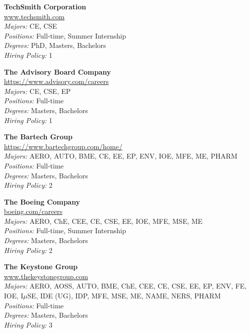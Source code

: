 \documentclass[twoside]{article}
\begin{document}
\begin{center}
\begin{multicols}{3}
\begin{minipage}{.9\columnwidth}{\Large\bf TechSmith Corporation }\\
	\url{www.techsmith.com}\\
	\emph{Majors:} CE, CSE\\
	\emph{Positions:} Full-time, Summer Internship\\
	\emph{Degrees:} PhD, Masters, Bachelors\\
	\emph{Hiring Policy:} 1\\
\end{minipage}
 
\begin{minipage}{.9\columnwidth}{\Large\bf The Advisory Board Company }\\
	\url{https://www.advisory.com/careers}\\
	\emph{Majors:} CE, CSE, EP\\
	\emph{Positions:} Full-time\\
	\emph{Degrees:} Masters, Bachelors\\
	\emph{Hiring Policy:} 1\\
\end{minipage}
 
\begin{minipage}{.9\columnwidth}{\Large\bf The Bartech Group }\\
	\url{https://www.bartechgroup.com/home/}\\
	\emph{Majors:} AERO, AUTO, BME, CE, EE, EP, ENV, IOE, MFE, ME, PHARM\\
	\emph{Positions:} Full-time\\
	\emph{Degrees:} Masters, Bachelors\\
	\emph{Hiring Policy:} 2\\
\end{minipage}
 
\begin{minipage}{.9\columnwidth}{\Large\bf The Boeing Company }\\
	\url{boeing.com/careers}\\
	\emph{Majors:} AERO, ChE, CEE, CE, CSE, EE, IOE, MFE, MSE, ME\\
	\emph{Positions:} Full-time, Summer Internship\\
	\emph{Degrees:} Masters, Bachelors\\
	\emph{Hiring Policy:} 2\\
\end{minipage}
 
\begin{minipage}{.9\columnwidth}{\Large\bf The Keystone Group }\\
	\url{www.thekeystonegroup.com}\\
	\emph{Majors:} AERO, AOSS, AUTO, BME, ChE, CEE, CE, CSE, EE, EP, ENV, FE, IOE, I$\mu$SE, IDE (UG), IDP, MFE, MSE, ME, NAME, NERS, PHARM\\
	\emph{Positions:} Full-time\\
	\emph{Degrees:} Masters, Bachelors\\
	\emph{Hiring Policy:} 3\\
\end{minipage}
 

\end{multicols}
\end{center}
\end{document}
